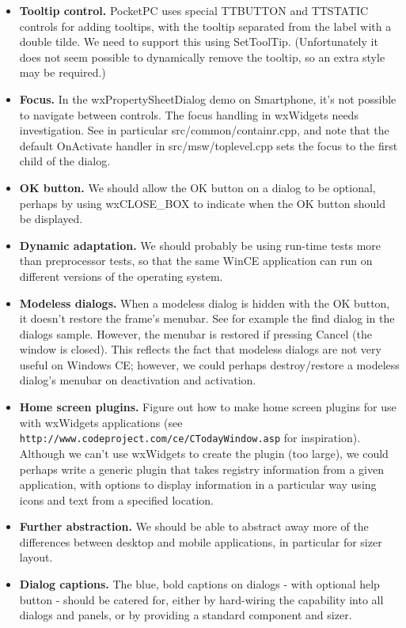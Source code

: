 \begin{itemize}
\item {\bf Tooltip control.} PocketPC uses special TTBUTTON and TTSTATIC controls for adding
tooltips, with the tooltip separated from the label with a double tilde. We need to support this using SetToolTip.
(Unfortunately it does not seem possible to dynamically remove the tooltip, so an extra style may
be required.)
\item {\bf Focus.} In the wxPropertySheetDialog demo on Smartphone, it's not possible to navigate
between controls. The focus handling in wxWidgets needs investigation. See in particular src/common/containr.cpp,
and note that the default OnActivate handler in src/msw/toplevel.cpp sets the focus to the first child of the dialog.
\item {\bf OK button.} We should allow the OK button on a dialog to be optional, perhaps
by using wxCLOSE\_BOX to indicate when the OK button should be displayed.
\item {\bf Dynamic adaptation.} We should probably be using run-time tests more
than preprocessor tests, so that the same WinCE application can run on different
versions of the operating system.
\item {\bf Modeless dialogs.} When a modeless dialog is hidden with the OK button, it doesn't restore the
frame's menubar. See for example the find dialog in the dialogs sample. However, the menubar is restored
if pressing Cancel (the window is closed). This reflects the fact that modeless dialogs are
not very useful on Windows CE; however, we could perhaps destroy/restore a modeless dialog's menubar
on deactivation and activation.
\item {\bf Home screen plugins.} Figure out how to make home screen plugins for use with wxWidgets
applications (see {\tt http://www.codeproject.com/ce/CTodayWindow.asp} for inspiration).
Although we can't use wxWidgets to create the plugin (too large), we could perhaps write
a generic plugin that takes registry information from a given application, with
options to display information in a particular way using icons and text from
a specified location.
\item {\bf Further abstraction.} We should be able to abstract away more of the differences
between desktop and mobile applications, in particular for sizer layout.
\item {\bf Dialog captions.} The blue, bold captions on dialogs - with optional help button -
should be catered for, either by hard-wiring the capability into all dialogs and panels,
or by providing a standard component and sizer.
\end{itemize}

